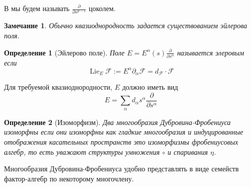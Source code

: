 \documentclass[a4paper, 10pt]{article}
\theoremstyle{plain}
\newtheorem{defin}{Определение}
\newtheorem*{rem}{Замечание}
\newcommand{\defeq}{:=}
\newcommand{\tang}[1][\hspace{0pt}]{\frac{\partial }{\partial #1}}
\begin{document}
В мы будем называть \(\tang[s^{\mu-1}]\) цоколем.
\par
\begin{rem}
    Обычно квазиоднородность задается существованием эйлерова поля.\par
\end{rem}
\begin{defin}[Эйлерово поле]
    Поле \(E = E^\alpha(s)\tang[s^\alpha]\) называется элеровым если \[\operatorname{Lie}_E \mathcal{F} \defeq E^\alpha \partial_\alpha \mathcal{F} = d_\mathcal{F} \cdot \mathcal{F}\]
\end{defin}
Для требуемой квазиоднородности, \(E\) должно иметь вид \[E = \sum_\alpha d_\alpha s^\alpha\tang[s^\alpha]\]
\begin{defin}[Изоморфизм]
    Два многообразия Дубровина-Фробениуса изоморфны если они изоморфны как гладкие многообразия и индуцированные отображения касательных пространств это изоморфизмы фробениусовых алгебр, то есть уважают структуры умножения \(\circ\) и спаривания \(\eta\).
\end{defin}
Многообразия Дубровина-Фробениуса удобно представлять в виде семейств фактор-алгебр по некоторому многочлену.
\end{document}
